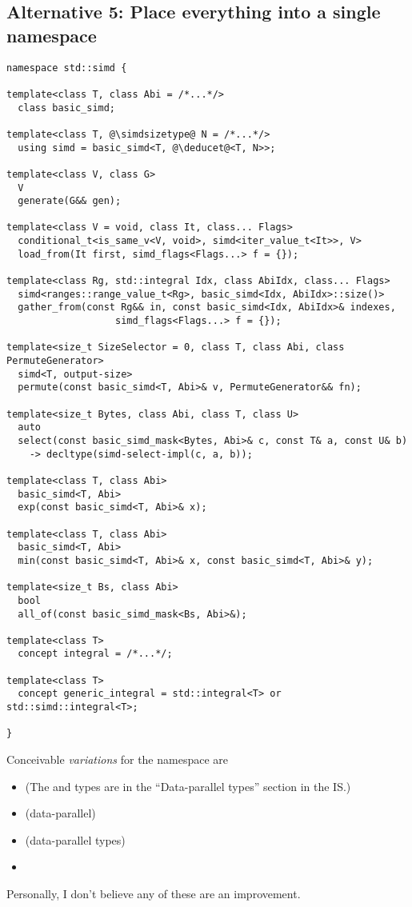 \subsection{Alternative 5: Place everything into a single namespace}
\label{sec:singlenamespace}

\medskip\begin{lstlisting}[style=Vc]
namespace std::simd {

template<class T, class Abi = /*...*/>
  class basic_simd;

template<class T, @\simdsizetype@ N = /*...*/>
  using simd = basic_simd<T, @\deducet@<T, N>>;

template<class V, class G>
  V
  generate(G&& gen);

template<class V = void, class It, class... Flags>
  conditional_t<is_same_v<V, void>, simd<iter_value_t<It>>, V>
  load_from(It first, simd_flags<Flags...> f = {});

template<class Rg, std::integral Idx, class AbiIdx, class... Flags>
  simd<ranges::range_value_t<Rg>, basic_simd<Idx, AbiIdx>::size()>
  gather_from(const Rg&& in, const basic_simd<Idx, AbiIdx>& indexes,
                   simd_flags<Flags...> f = {});

template<size_t SizeSelector = 0, class T, class Abi, class PermuteGenerator>
  simd<T, output-size>
  permute(const basic_simd<T, Abi>& v, PermuteGenerator&& fn);

template<size_t Bytes, class Abi, class T, class U>
  auto
  select(const basic_simd_mask<Bytes, Abi>& c, const T& a, const U& b)
    -> decltype(simd-select-impl(c, a, b));

template<class T, class Abi>
  basic_simd<T, Abi>
  exp(const basic_simd<T, Abi>& x);

template<class T, class Abi>
  basic_simd<T, Abi>
  min(const basic_simd<T, Abi>& x, const basic_simd<T, Abi>& y);

template<size_t Bs, class Abi>
  bool
  all_of(const basic_simd_mask<Bs, Abi>&);

template<class T>
  concept integral = /*...*/;

template<class T>
  concept generic_integral = std::integral<T> or std::simd::integral<T>;

}
\end{lstlisting}

Conceivable \emph{variations} for the \std{} namespace are
\begin{itemize}
  \item \std{} (The \simd and \mask types are in the “Data-parallel types” section in the IS.)
  \item \std{} (data-parallel)
  \item \std{} (data-parallel types)
  \item \std{}
\end{itemize}
Personally, I don't believe any of these are an improvement.

